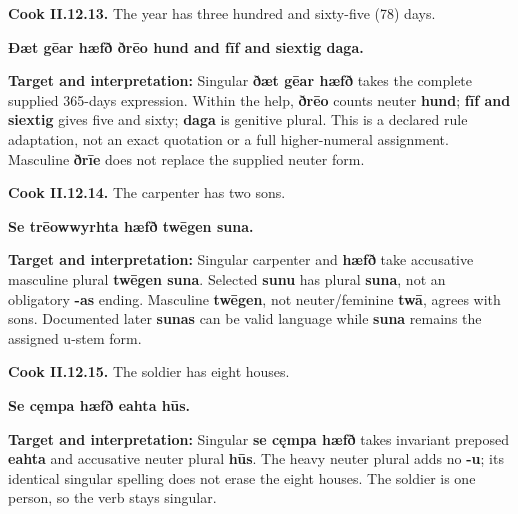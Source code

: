 \par\begin{minipage}{\linewidth}\raggedright
\textbf{Cook II.12.13.} The year has three hundred and sixty-five (78) days.

\textbf{Ðæt gēar hæfð ðrēo hund and fīf and siextig daga.}

\textbf{Target and interpretation:} Singular \textbf{ðæt gēar hæfð} takes the complete supplied 365-days expression. Within the help, \textbf{ðrēo} counts neuter \textbf{hund}; \textbf{fīf and siextig} gives five and sixty; \textbf{daga} is genitive plural. This is a declared rule adaptation, not an exact quotation or a full higher-numeral assignment. Masculine \textbf{ðrīe} does not replace the supplied neuter form.

\end{minipage}\par\addvspace{4pt}

\par\begin{minipage}{\linewidth}\raggedright
\textbf{Cook II.12.14.} The carpenter has two sons.

\textbf{Se trēowwyrhta hæfð twēgen suna.}

\textbf{Target and interpretation:} Singular carpenter and \textbf{hæfð} take accusative masculine plural \textbf{twēgen suna}. Selected \textbf{sunu} has plural \textbf{suna}, not an obligatory \textbf{-as} ending. Masculine \textbf{twēgen}, not neuter/\allowbreak{}feminine \textbf{twā}, agrees with sons. Documented later \textbf{sunas} can be valid language while \textbf{suna} remains the assigned u-stem form.

\end{minipage}\par\addvspace{4pt}

\par\begin{minipage}{\linewidth}\raggedright
\textbf{Cook II.12.15.} The soldier has eight houses.

\textbf{Se cęmpa hæfð eahta hūs.}

\textbf{Target and interpretation:} Singular \textbf{se cęmpa hæfð} takes invariant preposed \textbf{eahta} and accusative neuter plural \textbf{hūs}. The heavy neuter plural adds no \textbf{-u}; its identical singular spelling does not erase the eight houses. The soldier is one person, so the verb stays singular.

\end{minipage}\par\addvspace{4pt}

